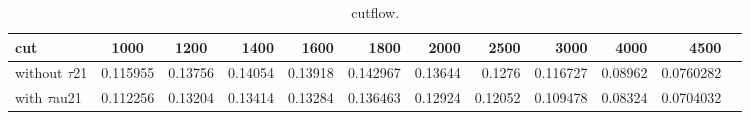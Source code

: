 \documentclass{article}
\begin{document}
  
  
 \begin{sidewaystable}[h]

  \begin{center}
    \begin{tabular}{l c c rrrrrrrrr}
\hline
cut  & 1000 & 1200 & 1400 & 1600 & 1800 & 2000 & 2500 & 3000 & 4000 & 4500\\
\hline
without $\tau$21  & 0.115955 & 0.13756 & 0.14054 & 0.13918 & 0.142967 & 0.13644 & 0.1276 & 0.116727 & 0.08962 & 0.0760282\\
with $\tau$au21  & 0.112256 & 0.13204 & 0.13414 & 0.13284 & 0.136463 & 0.12924 & 0.12052 & 0.109478 & 0.08324 & 0.0704032\\
\hline
\end{tabular}
  \end{center}
  \caption{cutflow.}

\end{sidewaystable}
\end{document}
